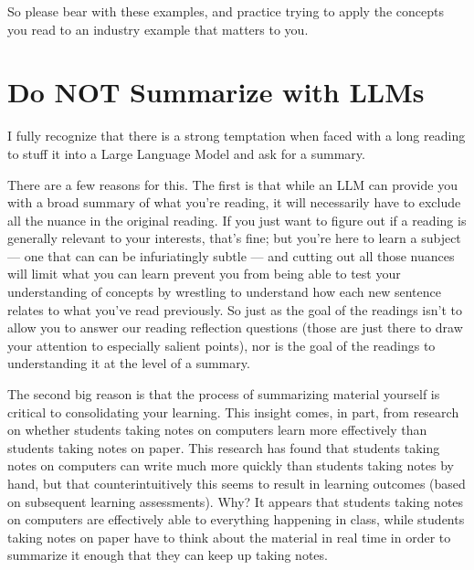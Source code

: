\documentclass[letterpaper,10pt,english]{jupyterBook}
\begin{document}
\sphinxAtStartPar
So please bear with these examples, and practice trying to apply the concepts you read to an industry example that matters to you.


\section{Do NOT Summarize with LLMs}
\label{\detokenize{40_in_practice/00_how_to_read_this_book:do-not-summarize-with-llms}}
\sphinxAtStartPar
I fully recognize that there is a strong temptation when faced with a long reading to stuff it into a Large Language Model and ask for a summary. 

\sphinxAtStartPar
There are a few reasons for this. The first is that while an LLM can provide you with a broad summary of what you’re reading, it will necessarily have to exclude all the nuance in the original reading. If you just want to figure out if a reading is generally relevant to your interests, that’s fine; but you’re here to learn a subject — one that can can be infuriatingly subtle — and cutting out all those nuances will limit what you can learn  prevent you from being able to test your understanding of concepts by wrestling to understand how each new sentence relates to what you’ve read previously. So just as the goal of the readings isn’t to allow you to answer our reading reflection questions (those are just there to draw your attention to especially salient points), nor is the goal of the readings to understanding it at the level of a summary.

\sphinxAtStartPar
The second big reason is that the process of summarizing material yourself is critical to consolidating your learning. This insight comes, in part, from research on whether students taking notes on computers learn more effectively than students taking notes on paper. This research has found that students taking notes on computers can write much more quickly than students taking notes by hand, but that counter\sphinxhyphen{}intuitively this seems to result in  learning outcomes (based on subsequent learning assessments). Why? It appears that students taking notes on computers are effectively able to  everything happening in class, while students taking notes on paper have to think about the material in real time in order to summarize it enough that they can keep up taking notes.
\end{document}
